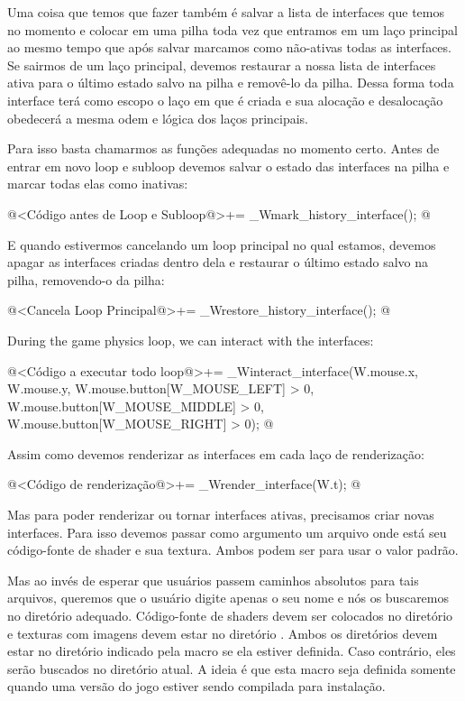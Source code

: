 Uma coisa que temos que fazer também é salvar a lista de interfaces
que temos no momento e colocar em uma pilha toda vez que entramos em
um laço principal ao mesmo tempo que após salvar marcamos como
não-ativas todas as interfaces. Se sairmos de um laço principal,
devemos restaurar a nossa lista de interfaces ativa para o último
estado salvo na pilha e removê-lo da pilha. Dessa forma toda interface
terá como escopo o laço em que é criada e sua alocação e desalocação
obedecerá a mesma odem e lógica dos laços principais.

Para isso basta chamarmos as funções adequadas no momento
certo. Antes de entrar em novo loop e subloop devemos salvar o estado
das interfaces na pilha e marcar todas elas como inativas:

\iniciocodigo
@<Código antes de Loop e Subloop@>+=
_Wmark_history_interface();
@
\fimcodigo

E quando estivermos cancelando um loop principal no qual estamos,
devemos apagar as interfaces criadas dentro dela e restaurar o último
estado salvo na pilha, removendo-o da pilha:

\iniciocodigo
@<Cancela Loop Principal@>+=
_Wrestore_history_interface();
@
\fimcodigo

During the game physics loop, we can interact with the interfaces:

\iniciocodigo
@<Código a executar todo loop@>+=
_Winteract_interface(W.mouse.x, W.mouse.y,
                     W.mouse.button[W_MOUSE_LEFT] > 0,
                     W.mouse.button[W_MOUSE_MIDDLE] > 0,
                     W.mouse.button[W_MOUSE_RIGHT] > 0);
@
\fimcodigo

Assim como devemos renderizar as interfaces em cada laço de
renderização:

\iniciocodigo
@<Código de renderização@>+=
_Wrender_interface(W.t);
@
\fimcodigo

Mas para poder renderizar ou tornar interfaces ativas, precisamos
criar novas interfaces. Para isso devemos passar como argumento um
arquivo onde está seu código-fonte de shader e sua textura. Ambos
podem ser  para usar o valor padrão.

Mas ao invés de esperar que usuários passem caminhos absolutos para
tais arquivos, queremos que o usuário digite apenas o seu nome e nós
os buscaremos no diretório adequado. Código-fonte de shaders devem ser
colocados no diretório  e texturas com imagens
devem estar no diretório . Ambos os diretórios
devem estar no diretório indicado pela macro 
se ela estiver definida. Caso contrário, eles serão buscados no
diretório atual. A ideia é que esta macro seja definida somente quando
uma versão do jogo estiver sendo compilada para instalação.

